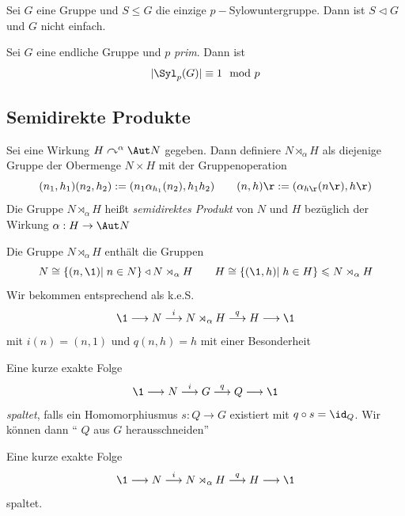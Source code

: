 \documentclass[11pt, a4paper]{article}
\begin{document}
\begin{corollary} Sei $G$ eine Gruppe und $S\leqslant G$ die einzige $p-$Sylowuntergruppe. Dann ist $S\triangleleft G$ und $G$ nicht einfach.   
\end{corollary}

\begin{theorem}
Sei $G$ eine endliche Gruppe und $p$ \emph{prim}. Dann ist
$$|\Syl_p(G)| \equiv 1 \mod p$$
\end{theorem}

\subsection{Semidirekte Produkte}

\begin{definition}
    Sei eine Wirkung $H\curvearrowright^\alpha \Aut N$ gegeben. Dann definiere $N\rtimes_\alpha H$ als diejenige Gruppe der Obermenge $N\times H$ mit der Gruppenoperation
    $$(n_1, h_1)(n_2, h_2) := (n_1\alpha_{h_1}(n_2), h_1h_2) \qquad (n,h)\r:=(\alpha_{h\r}(n\r),h\r)$$
    Die Gruppe $N\rtimes_\alpha H$ heißt \emph{semidirektes Produkt} von $N$ und $H$ bezüglich der Wirkung $\alpha:H \to \Aut N$
\end{definition}

\begin{note}
    Die Gruppe $N\rtimes_\alpha H$ enthält die Gruppen
    $$N\cong \{(n,\1)|\; n\in N\} \triangleleft N\rtimes_\alpha H \qquad H\cong \{(\1,h)|\; h\in H\}\leqslant N\rtimes_\alpha H$$
    Wir bekommen entsprechend als k.e.S.
    $$\1 \longrightarrow N \overset{i}{\longrightarrow} N \rtimes_\alpha H \overset{q}{\longrightarrow} H \longrightarrow \1$$
    mit $i(n)=(n,1)$ und $q(n,h)=h$ mit einer Besonderheit
\end{note}

\begin{definition}
Eine kurze exakte Folge $$\1 \longrightarrow N \overset{i}{\longrightarrow} G \overset{q}{\longrightarrow} Q\longrightarrow \1 $$
\emph{spaltet}, falls ein Homomorphiusmus $s:Q \to G$ existiert mit $q\circ s = \id_Q$. Wir können dann `` $Q$ aus $G$ herausschneiden''
\end{definition}

\begin{note}
    Eine kurze exakte Folge 
    $$\1 \longrightarrow N \overset{i}{\longrightarrow} N \rtimes_\alpha H \overset{q}{\longrightarrow} H \longrightarrow \1$$
    spaltet.
\end{note}
\end{document}
